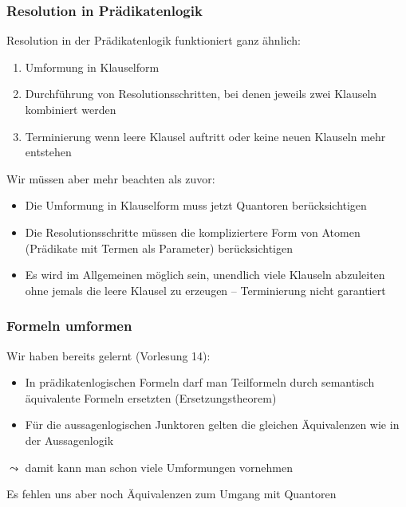 \documentclass[onlymath]{beamer}
\begin{document}
\begin{frame}\frametitle{Resolution in Prädikatenlogik}

Resolution in der Prädikatenlogik funktioniert ganz ähnlich:
\begin{enumerate}[(1)]
\item Umformung in Klauselform
\item Durchführung von Resolutionsschritten, bei denen jeweils zwei Klauseln kombiniert werden
\item Terminierung wenn leere Klausel auftritt oder keine neuen Klauseln mehr entstehen
\end{enumerate}
\bigskip

Wir müssen aber mehr beachten als zuvor:
\begin{itemize}
\item Die Umformung in Klauselform muss jetzt \alert{Quantoren} berücksichtigen
\item Die Resolutionsschritte müssen die \alert{kompliziertere Form von Atomen} (Prädikate mit Termen als Parameter) berücksichtigen
\item Es wird im Allgemeinen möglich sein, unendlich viele Klauseln abzuleiten ohne jemals die leere Klausel zu erzeugen -- \alert{Terminierung nicht garantiert}
\end{itemize}

\end{frame}


\begin{frame}\frametitle{Formeln umformen}

Wir haben bereits gelernt (Vorlesung 14):
\begin{itemize}
\item In prädikatenlogischen Formeln darf man Teilformeln durch semantisch äquivalente
Formeln ersetzten (Ersetzungstheorem)
\item Für die aussagenlogischen Junktoren gelten die gleichen Äquivalenzen wie in der Aussagenlogik
\end{itemize}
$\leadsto$ damit kann man schon viele Umformungen vornehmen
\bigskip

Es fehlen uns aber noch Äquivalenzen zum Umgang mit Quantoren

\end{frame}
\end{document}
